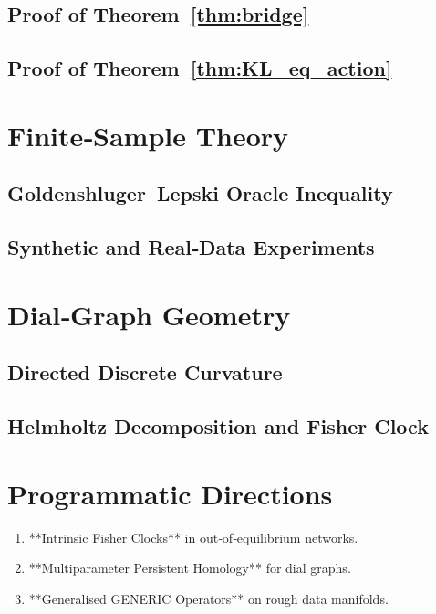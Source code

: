 \documentclass[11pt]{article}
\begin{document}
\subsection{Proof of Theorem~\ref{thm:bridge}}

\subsection{Proof of Theorem~\ref{thm:KL_eq_action}}

\section{Finite‑Sample Theory}
\subsection{Goldenshluger–Lepski Oracle Inequality}

\subsection{Synthetic and Real‑Data Experiments}

\section{Dial‑Graph Geometry}
\subsection{Directed Discrete Curvature}

\subsection{Helmholtz Decomposition and Fisher Clock}

\section{Programmatic Directions}
\begin{enumerate}[label=\textbf{P\arabic*},leftmargin=*]
\item **Intrinsic Fisher Clocks** in out‑of‑equilibrium networks.  
\item **Multiparameter Persistent Homology** for dial graphs.  
\item **Generalised GENERIC Operators** on rough data manifolds.  
\end{enumerate}
\end{document}
